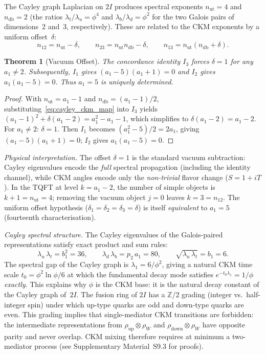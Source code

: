 \documentclass[12pt,a4paper]{article}
\newtheorem{theorem}{Theorem}
\theoremstyle{definition}
\begin{document}
The Cayley graph Laplacian on $2I$ produces spectral exponents $n_{\text{ut}} = 4$ and $n_{\text{db}} = 2$ (the ratios $\lambda_t/\lambda_u = \phi^4$ and $\lambda_b/\lambda_d = \phi^2$ for the two Galois pairs of dimensions~2 and~3, respectively).  These are related to the CKM exponents by a uniform offset~$\delta$:
\begin{equation}
n_{12} = n_{\text{ut}} - \delta, \qquad
n_{23} = n_{\text{ut}} n_{\text{db}} - \delta, \qquad
n_{13} = n_{\text{ut}}(n_{\text{db}} + \delta).
\label{eq:cayley_ckm_map}
\end{equation}
\begin{theorem}[Vacuum Offset]
\label{thm:vacuum_offset}
The concordance identity $I_3$ forces $\delta = 1$ for any $a_1 \neq 2$.  Subsequently, $I_1$ gives $(a_1 - 5)(a_1 + 1) = 0$ and $I_2$ gives $a_1(a_1 - 5) = 0$.  Thus $a_1 = 5$ is uniquely determined.
\end{theorem}
\begin{proof}
With $n_{\text{ut}} = a_1 - 1$ and $n_{\text{db}} = (a_1 - 1)/2$, substituting~\eqref{eq:cayley_ckm_map} into $I_3$ yields $(a_1-1)^2 + \delta(a_1-2) = a_1^2 - a_1 - 1$, which simplifies to $\delta(a_1-2) = a_1-2$.  For $a_1 \neq 2$: $\delta = 1$.  Then $I_1$ becomes $(a_1^2 - 5)/2 = 2a_1$, giving $(a_1-5)(a_1+1) = 0$; $I_2$ gives $a_1(a_1-5) = 0$.
\end{proof}

\noindent\textit{Physical interpretation.}  The offset $\delta = 1$ is the standard vacuum subtraction: Cayley eigenvalues encode the \emph{full} spectral propagation (including the identity channel), while CKM angles encode only the \emph{non-trivial} flavor change ($S = 1 + iT$).  In the TQFT at level $k = a_1 - 2$, the number of simple objects is $k + 1 = n_{\text{ut}} = 4$; removing the vacuum object $j = 0$ leaves $k = 3 = n_{12}$.  The uniform offset hypothesis ($\delta_1 = \delta_2 = \delta_3 = \delta$) is itself \emph{equivalent} to $a_1 = 5$ (fourteenth characterisation).

\noindent\textit{Cayley spectral structure.}  The Cayley eigenvalues of the Galois-paired representations satisfy exact product and sum rules:
\begin{equation}
\lambda_u \,\lambda_t = b_1^2 = 36, \qquad
\lambda_d \,\lambda_b = p_2\,a_1 = 80, \qquad
\sqrt{\lambda_u\,\lambda_t} = b_1 = 6.
\label{eq:cayley_products}
\end{equation}
The spectral gap of the Cayley graph is $\lambda_1 = 6/\phi^2$, giving a natural CKM time scale $t_0 = \phi^2 \ln\phi / 6$ at which the fundamental decay mode satisfies $e^{-t_0 \lambda_1} = 1/\phi$ \emph{exactly}.  This explains why $\phi$ is the CKM base: it is the natural decay constant of the Cayley graph of~$2I$.  The fusion ring of $2I$ has a $\mathbb{Z}/2$ grading (integer vs.\ half-integer spin) under which up-type quarks are odd and down-type quarks are even.  This grading implies that single-mediator CKM transitions are forbidden: the intermediate representations from $\rho_{\text{up}} \otimes \rho_W$ and $\rho_{\text{down}} \otimes \rho_W$ have opposite parity and never overlap.  CKM mixing therefore requires at minimum a two-mediator process (see Supplementary Material~S9.3 for proofs).
\end{document}
